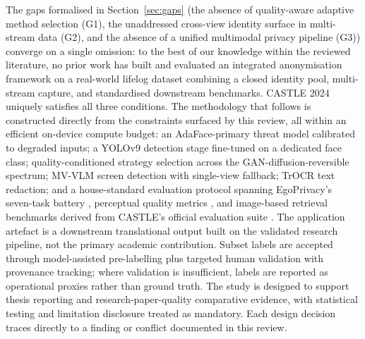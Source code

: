 \documentclass[12pt, onecolumn]{IEEEtran}
\begin{document}
The gaps formalised in Section~\ref{sec:gaps} (the absence of
quality-aware adaptive method selection (G1), the unaddressed cross-view
identity surface in multi-stream data (G2), and the absence of a unified
multimodal privacy pipeline (G3)) converge on a single omission: to the
best of our knowledge within the reviewed literature, no prior work has
built and evaluated an integrated anonymisation framework on a
real-world lifelog dataset combining a closed identity pool, multi-stream
capture, and standardised downstream benchmarks. CASTLE 2024
\cite{rossetto2025castle} uniquely satisfies all three conditions. The
methodology that follows is constructed directly from the constraints
surfaced by this review, all within an efficient on-device compute budget: an
AdaFace-primary \cite{kim2022adaface} threat model calibrated to
degraded inputs; a YOLOv9 \cite{wang2024yolov9} detection stage
fine-tuned on a dedicated face class; quality-conditioned strategy
selection across the GAN-diffusion-reversible spectrum; MV-VLM
\cite{li2026screen} screen detection with single-view fallback; TrOCR
\cite{li2023trocr} text redaction; and a house-standard evaluation
protocol spanning EgoPrivacy's seven-task battery \cite{li2025egoprivacy},
perceptual quality metrics
\cite{heusel2017fid, zhang2018lpips, wang2004ssim}, and
image-based retrieval benchmarks derived from CASTLE's official
evaluation suite \cite{rossetto2025castle}. The application artefact is
a downstream translational output built on the validated research
pipeline, not the primary academic contribution. Subset labels are
accepted through model-assisted pre-labelling plus targeted human
validation with provenance tracking; where validation is insufficient,
labels are reported as operational proxies rather than ground truth. The
study is designed to support thesis reporting and research-paper-quality
comparative evidence, with statistical testing and limitation disclosure
treated as mandatory. Each design decision traces directly to a finding
or conflict documented in this review.


\hfill \break

\printbibliography
\end{document}
